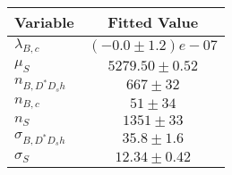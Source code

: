 \begin{tabular}[t]{lc}
\hline
Variable &Fitted Value\\
\hline\hline
$\lambda_{B,c}$&$(-0.0\pm1.2)e-07$\\
\hline
$\mu_S$&$5279.50\pm0.52$\\
\hline
$n_{B, D^* D_s h}$&$667\pm32$\\
\hline
$n_{B,c}$&$51\pm34$\\
\hline
$n_S$&$1351\pm33$\\
\hline
$\sigma_{B, D^* D_s h}$&$35.8\pm1.6$\\
\hline
$\sigma_S$&$12.34\pm0.42$\\
\hline
\end{tabular}